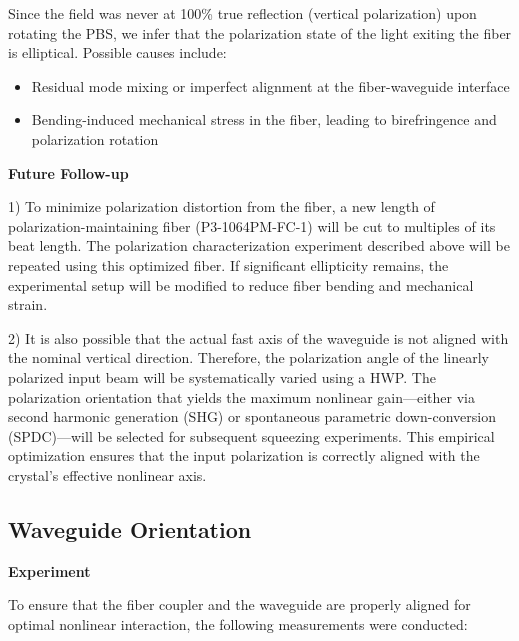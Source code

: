 \documentclass[colorlinks=true,pdfstartview=FitV,linkcolor=blue,
citecolor=red,urlcolor=magenta]{ligodoc}
\begin{document}
Since the field was never at 100\% true reflection (vertical polarization) upon rotating the PBS, we infer that the polarization state of the light exiting the fiber is elliptical. Possible causes include:

\begin{itemize}
    \item Residual mode mixing or imperfect alignment at the fiber-waveguide interface
    \item Bending-induced mechanical stress in the fiber, leading to birefringence and polarization rotation
\end{itemize}

\textbf{Future Follow-up}

1) To minimize polarization distortion from the fiber, a new length of polarization-maintaining fiber (P3-1064PM-FC-1) will be cut to multiples of its beat length. The polarization characterization experiment described above will be repeated using this optimized fiber. If significant ellipticity remains, the experimental setup will be modified to reduce fiber bending and mechanical strain.

2) It is also possible that the actual fast axis of the waveguide is not aligned with the nominal vertical direction. Therefore, the polarization angle of the linearly polarized input beam will be systematically varied using a HWP. The polarization orientation that yields the maximum nonlinear gain—either via second harmonic generation (SHG) or spontaneous parametric down-conversion (SPDC)—will be selected for subsequent squeezing experiments. This empirical optimization ensures that the input polarization is correctly aligned with the crystal’s effective nonlinear axis.


\subsection{Waveguide Orientation}

\textbf{Experiment}

To ensure that the fiber coupler and the waveguide are properly aligned for optimal nonlinear interaction, the following measurements were conducted:
\end{document}
